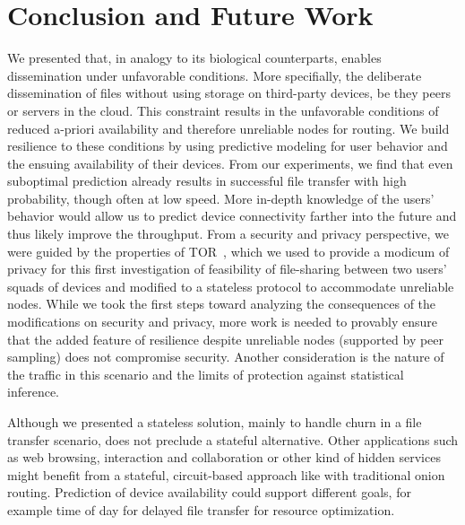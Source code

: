 \section{Conclusion and Future Work}%
\label{conclusion}

We presented \name that, in analogy to its biological
counterparts, enables dissemination under unfavorable conditions. More
specifially, the deliberate dissemination of files without using
storage on third-party devices, be they peers or servers in the
cloud. This constraint results in the unfavorable conditions of
reduced a-priori availability and therefore unreliable nodes for
routing. We build resilience to these conditions by using predictive
modeling for user behavior and the ensuing availability of their
devices. From our experiments, we find that even suboptimal prediction
already results in successful file transfer with high probability,
though often at low speed. More in-depth knowledge of the users'
behavior would allow us to predict device connectivity farther into
the future and thus likely improve the throughput. From a security and
privacy perspective, we were guided by the properties of
TOR~\cite{Tor}, which we used to provide a modicum of privacy for this
first investigation of feasibility of file-sharing between two users'
squads of devices and modified to a stateless protocol to
accommodate unreliable nodes. While we took the first steps toward
analyzing the consequences of the modifications on security and
privacy, more work is needed to provably ensure that the added feature
of resilience despite unreliable nodes (supported by peer sampling)
does 
not compromise security. Another
consideration is the nature of the traffic in this scenario and the
limits of protection against statistical inference. 

Although we presented a stateless solution, mainly to handle churn in
a file transfer scenario, \name does not preclude a stateful alternative. 
Other applications such as web browsing, interaction and
collaboration or other kind of hidden services might benefit from a stateful, circuit-based approach
like with traditional onion routing. Prediction of device availability
could support different goals, for example time of day for delayed
file transfer for resource optimization. 


